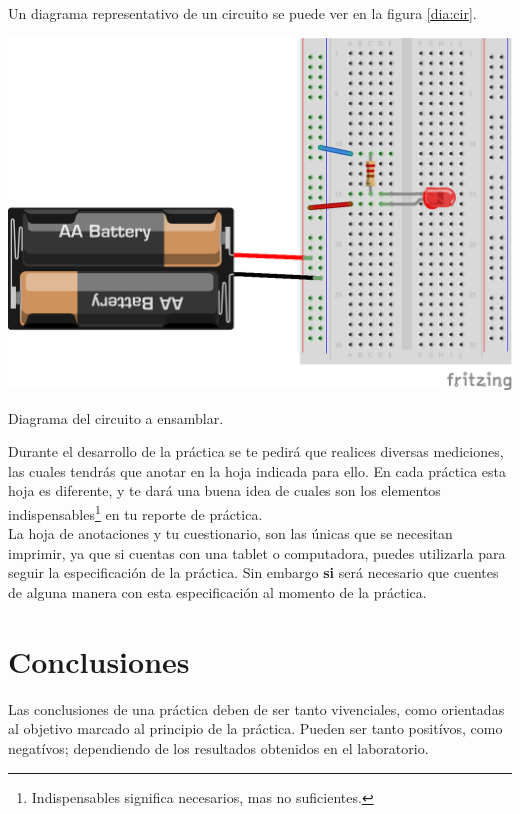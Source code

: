     Un diagrama representativo de un circuito se puede ver en la figura \ref{dia:cir}. \\

    \begin{marginfigure}%
    	\begin{center}
    		\includegraphics[width=\textwidth]{images/LED-bateria.png}
    		\caption{Diagrama del circuito a ensamblar.}
    		\label{dia:cir}
    	\end{center}
    \end{marginfigure}

    Durante el desarrollo de la práctica se te pedirá que realices diversas mediciones, las cuales tendrás que anotar en la hoja indicada para ello. En cada práctica esta hoja es diferente, y te dará una buena idea de cuales son los elementos indispensables\footnote{Indispensables significa necesarios, mas no suficientes.} en tu reporte de práctica. \\

    La hoja de anotaciones y tu cuestionario, son las únicas que se necesitan imprimir, ya que si cuentas con una tablet o computadora, puedes utilizarla para seguir la especificación de la práctica. Sin embargo \textbf{si} será necesario que cuentes de alguna manera con esta especificación al momento de la práctica.


\section{Conclusiones}
	Las conclusiones de una práctica deben de ser tanto vivenciales, como orientadas al objetivo marcado al principio de la práctica. Pueden ser tanto positívos, como negatívos; dependiendo de los resultados obtenidos en el laboratorio. \\


